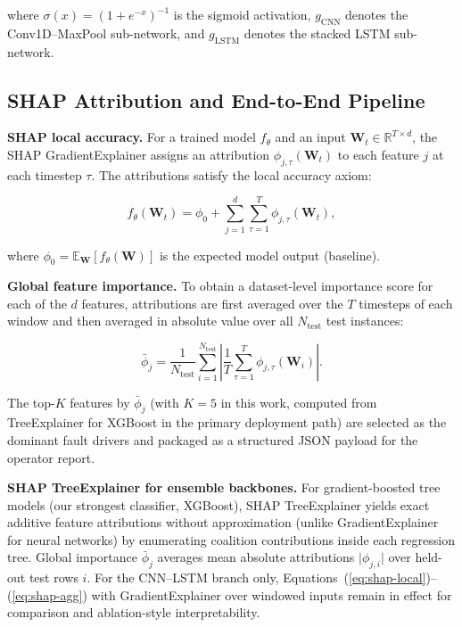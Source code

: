 \documentclass[sensors,article,submit,pdftex,moreauthors]{Definitions/mdpi}
\begin{document}
\noindent where $\sigma(x) = (1 + e^{-x})^{-1}$ is the sigmoid
activation, $g_\text{CNN}$ denotes the Conv1D--MaxPool sub-network,
and $g_\text{LSTM}$ denotes the stacked LSTM sub-network.

\subsection{SHAP Attribution and End-to-End Pipeline}

\textbf{SHAP local accuracy.}
For a trained model $f_\theta$ and an input
$\mathbf{W}_t \in \mathbb{R}^{T \times d}$, the SHAP
GradientExplainer \citep{ref-shap-lundberg} assigns an attribution
$\phi_{j,\tau}(\mathbf{W}_t)$ to each feature $j$ at each
timestep $\tau$.
The attributions satisfy the local accuracy axiom:

\begin{linenomath}
\begin{equation}
f_\theta(\mathbf{W}_t) = \phi_0 +
  \sum_{j=1}^{d} \sum_{\tau=1}^{T}
  \phi_{j,\tau}(\mathbf{W}_t),
\label{eq:shap-local}
\end{equation}
\end{linenomath}

\noindent where $\phi_0 = \mathbb{E}_{\mathbf{W}}[f_\theta(\mathbf{W})]$
is the expected model output (baseline).

\textbf{Global feature importance.}
To obtain a dataset-level importance score for each of the $d$
features, attributions are first averaged over the $T$ timesteps
of each window and then averaged in absolute value over all
$N_\text{test}$ test instances:

\begin{linenomath}
\begin{equation}
\bar{\phi}_j =
  \frac{1}{N_\text{test}}
  \sum_{i=1}^{N_\text{test}}
  \left\lvert
    \frac{1}{T}\sum_{\tau=1}^{T}
    \phi_{j,\tau}(\mathbf{W}_i)
  \right\rvert.
\label{eq:shap-agg}
\end{equation}
\end{linenomath}

\noindent The top-$K$ features by $\bar{\phi}_j$ (with $K = 5$
in this work, computed from TreeExplainer for XGBoost in the primary
deployment path) are selected as the dominant fault drivers and
packaged as a structured JSON payload for the operator report.

\textbf{SHAP TreeExplainer for ensemble backbones.}
For gradient-boosted tree models (our strongest classifier, XGBoost),
SHAP TreeExplainer yields exact additive feature attributions without
approximation (unlike GradientExplainer for neural networks) by
enumerating coalition contributions inside each regression tree.
Global importance $\bar{\phi}_j$ averages mean absolute attributions
$\lvert\phi_{j,i}\rvert$ over held-out test rows $i$.
For the CNN--LSTM branch only, Equations~(\ref{eq:shap-local})--(\ref{eq:shap-agg})
with GradientExplainer over windowed inputs remain in effect for
comparison and ablation-style interpretability.
\end{document}
